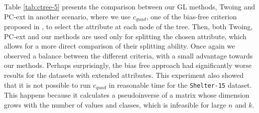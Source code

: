 


Table \ref{tab:ctree-5} presents the 
comparison between our GL methods, Twoing and PC-ext in another scenario,
where we use $c_{quad}$, one of the bias-free criterion proposed in \cite{Hothorn:2006:URP}, to select the attribute at each node of the tree. 
Then, both Twoing, PC-ext and our methods are  used only for splitting the chosen attribute,  which allows for a  more direct comparison of their splitting ability. Once again we observed a balance between the different criteria, with a small advantage towards our methods. Perhaps surprisingly, the bias free approach had significantly worse results for the datasets with extended attributes. This experiment also showed that it is not possible to run $c_{quad}$ in reasonable time for the {\tt Shelter-15} dataset. This happens because it calculates a pseudoinverse of a matrix whose dimension grows with the number of values and classes, which is infeasible for large $n$ and $k$.


